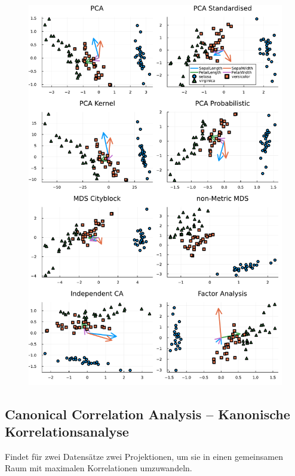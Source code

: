 \documentclass[10pt,twocolumn]{scrartcl}
\begin{document}
\begin{figure}[ht]
  \centering
  \includegraphics[width=.95\columnwidth]{pca.pdf}
\end{figure}

\subsection{Canonical Correlation Analysis -- Kanonische Korrelationsanalyse}

Findet für zwei Datensätze zwei Projektionen, um sie in einen gemeinsamen Raum
mit maximalen Korrelationen umzuwandeln.
\end{document}

